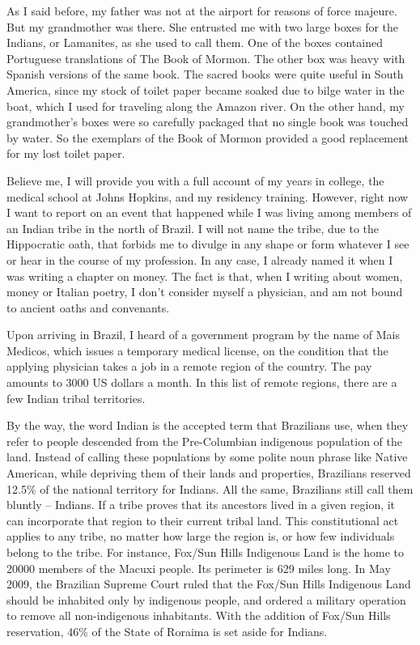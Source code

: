 \documentclass[
  12pt,
]{book}
\begin{document}
As I said before, my father was not at the airport for reasons of force
majeure. But my grandmother was there. She entrusted me with two large
boxes for the Indians, or Lamanites, as she used to call them. One of
the boxes contained Portuguese translations of The Book of Mormon. The
other box was heavy with Spanish versions of the same book. The sacred
books were quite useful in South America, since my stock of toilet paper
became soaked due to bilge water in the boat, which I used for traveling
along the Amazon river. On the other hand, my grandmother's boxes were
so carefully packaged that no single book was touched by water. So the
exemplars of the Book of Mormon provided a good replacement for my lost
toilet paper.

Believe me, I will provide you with a full account of my years in
college, the medical school at Johns Hopkins, and my residency training.
However, right now I want to report on an event that happened while I
was living among members of an Indian tribe in the north of Brazil. I
will not name the tribe, due to the Hippocratic oath, that forbids me to
divulge in any shape or form whatever I see or hear in the course of my
profession. In any case, I already named it when I was writing a chapter
on money. The fact is that, when I writing about women, money or Italian
poetry, I don't consider myself a physician, and am not bound to ancient
oaths and convenants.

Upon arriving in Brazil, I heard of a government program by the name of
Mais Medicos, which issues a temporary medical license, on the condition
that the applying physician takes a job in a remote region of the
country. The pay amounts to 3000 US dollars a month. In this list of
remote regions, there are a few Indian tribal territories.

By the way, the word Indian is the accepted term that Brazilians use,
when they refer to people descended from the Pre-Columbian indigenous
population of the land. Instead of calling these populations by some
polite noun phrase like Native American, while depriving them of their
lands and properties, Brazilians reserved 12.5\% of the national
territory for Indians. All the same, Brazilians still call them bluntly
-- Indians. If a tribe proves that its ancestors lived in a given
region, it can incorporate that region to their current tribal land.
This constitutional act applies to any tribe, no matter how large the
region is, or how few individuals belong to the tribe. For instance,
Fox/Sun Hills Indigenous Land is the home to 20000 members of the Macuxi
people. Its perimeter is 629 miles long. In May 2009, the Brazilian
Supreme Court ruled that the Fox/Sun Hills Indigenous Land should be
inhabited only by indigenous people, and ordered a military operation to
remove all non-indigenous inhabitants. With the addition of Fox/Sun
Hills reservation, 46\% of the State of Roraima is set aside for
Indians.
\end{document}
